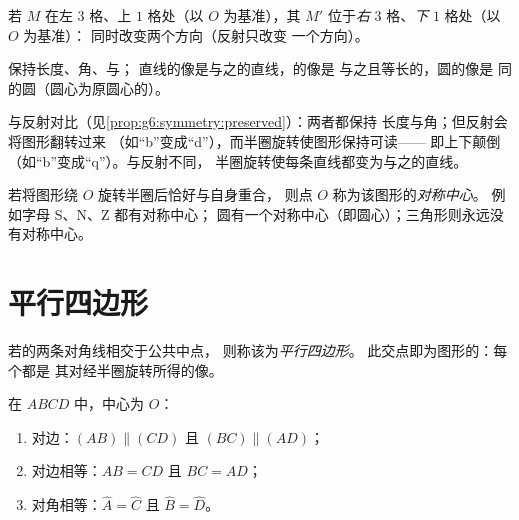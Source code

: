\begin{example}[在方格纸上]\label{ex:g7:central:grid}
若 $M$ 在左 $3$ 格、上 $1$ 格处（以 $O$ 为基准），其
$M'$ 位于\emph{右} $3$ 格、\emph{下} $1$ 格处（以 $O$ 为基准）：
同时改变两个方向（反射只改变
一个方向）。
\end{example}

\begin{proposition}[半圈旋转保持的性质]\label{prop:g7:central:preserved}
保持长度、角、与；
直线的像是与之\emph{}的直线，的像是
与之且等长的，圆的像是
同的圆（圆心为原圆心的）。
\end{proposition}
\admitted

\begin{remark}
与反射对比（见\cref{prop:g6:symmetry:preserved}）：两者都保持
长度与角；但反射会将图形翻转过来
（如“b”变成“d”），而半圈旋转使图形保持可读——
即上下颠倒（如“b”变成“q”）。与反射不同，
半圈旋转使每条直线都变为与之的直线。
\end{remark}

\begin{definition}[对称中心]\label{def:g7:central:center}
若将图形绕 $O$ 旋转半圈后恰好与自身重合，
则点 $O$ 称为该图形的\emph{对称中心}。
例如字母 S、N、Z 都有对称中心；
圆有一个对称中心（即圆心）；三角形则永远没有对称中心。
\end{definition}

\section{平行四边形}

\begin{definition}[平行四边形]\label{def:g7:central:parallelogram}
若的两条对角线相交于公共中点，
则称该为\emph{平行四边形}。
此交点即为图形的：每个都是
其对经半圈旋转所得的像。
\end{definition}

\begin{theorem}[平行四边形的性质]\label{thm:g7:central:properties}
在 $ABCD$ 中，中心为 $O$：
\begin{enumerate}
  \item 对边：$(AB) \parallel (CD)$ 且
        $(BC) \parallel (AD)$；
  \item 对边相等：$AB = CD$ 且
        $BC = AD$；
  \item 对角相等：$\widehat A = \widehat C$ 且
        $\widehat B = \widehat D$。
\end{enumerate}
\end{theorem}

